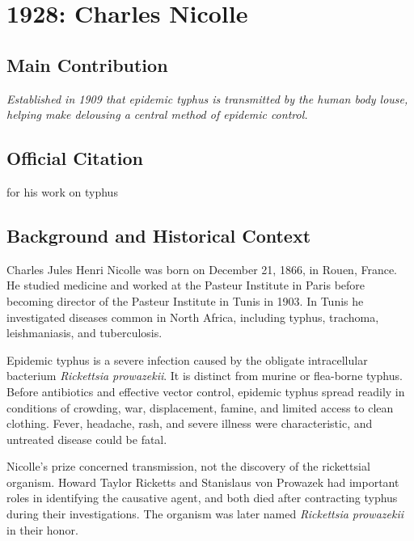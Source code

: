 \chapter[1928 --- Nicolle]{1928: Charles Nicolle}
\label{ch:1928_charlesnicolle}

\section*{Main Contribution}

\textit{Established in 1909 that epidemic typhus is transmitted by the human body louse, helping make delousing a central method of epidemic control.}\cite{nobel-1928,lecture-1928}

\section{Official Citation}

for his work on typhus\cite{nobel-1928}

\section{Background and Historical Context}

Charles Jules Henri Nicolle was born on December 21, 1866, in Rouen, France. He studied medicine and worked at the Pasteur Institute in Paris before becoming director of the Pasteur Institute in Tunis in 1903. In Tunis he investigated diseases common in North Africa, including typhus, trachoma, leishmaniasis, and tuberculosis.

Epidemic typhus is a severe infection caused by the obligate intracellular bacterium \emph{Rickettsia prowazekii}. It is distinct from murine or flea-borne typhus. Before antibiotics and effective vector control, epidemic typhus spread readily in conditions of crowding, war, displacement, famine, and limited access to clean clothing. Fever, headache, rash, and severe illness were characteristic, and untreated disease could be fatal.

Nicolle's prize concerned transmission, not the discovery of the rickettsial organism. Howard Taylor Ricketts and Stanislaus von Prowazek had important roles in identifying the causative agent, and both died after contracting typhus during their investigations. The organism was later named \emph{Rickettsia prowazekii} in their honor.

